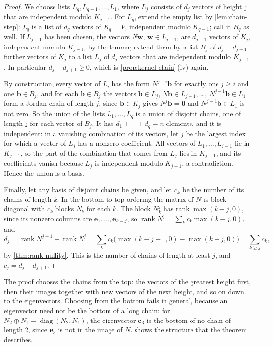 \begin{proof}
We choose lists $L_q,L_{q-1},\ldots,L_1$, where $L_j$ consists of $d_j$ vectors of height $j$ that are independent modulo $K_{j-1}$. For $L_q$, extend the empty list by \cref{lem:chain-step}: $L_q$ is a list of $d_q$ vectors of $K_q=V$, independent modulo $K_{q-1}$; call it $B_q$ as well. If $L_{j+1}$ has been chosen, the vectors $N\mathbf w$, $\mathbf w\in L_{j+1}$, are $d_{j+1}$ vectors of $K_j$, independent modulo $K_{j-1}$, by the lemma; extend them by a list $B_j$ of $d_j-d_{j+1}$ further vectors of $K_j$ to a list $L_j$ of $d_j$ vectors that are independent modulo $K_{j-1}$. In particular $d_j-d_{j+1}\ge0$, which is \cref{prop:kernel-chain}\,(iv) again.

By construction, every vector of $L_i$ has the form $N^{j-i}\mathbf b$ for exactly one $j\ge i$ and one $\mathbf b\in B_j$, and for each $\mathbf b\in B_j$ the vectors $\mathbf b\in L_j$, $N\mathbf b\in L_{j-1}$, \ldots, $N^{j-1}\mathbf b\in L_1$ form a Jordan chain of length $j$, since $\mathbf b\in K_j$ gives $N^j\mathbf b=\mathbf 0$ and $N^{j-1}\mathbf b\in L_1$ is not zero. So the union of the lists $L_1,\ldots,L_q$ is a union of disjoint chains, one of length $j$ for each vector of $B_j$. It has $d_1+\cdots+d_q=n$ elements, and it is independent: in a vanishing combination of its vectors, let $j$ be the largest index for which a vector of $L_j$ has a nonzero coefficient. All vectors of $L_1,\ldots,L_{j-1}$ lie in $K_{j-1}$, so the part of the combination that comes from $L_j$ lies in $K_{j-1}$, and its coefficients vanish because $L_j$ is independent modulo $K_{j-1}$, a contradiction. Hence the union is a basis.

Finally, let any basis of disjoint chains be given, and let $c_k$ be the number of its chains of length $k$. In the bottom-to-top ordering the matrix of $N$ is block diagonal with $c_k$ blocks $N_k$ for each $k$. The block $N_k^j$ has rank $\max(k-j,0)$, since its nonzero columns are $\mathbf e_1,\ldots,\mathbf e_{k-j}$, so $\operatorname{rank}N^j=\sum_kc_k\max(k-j,0)$, and
\[
d_j=\operatorname{rank}N^{j-1}-\operatorname{rank}N^j=\sum_kc_k\bigl(\max(k-j+1,0)-\max(k-j,0)\bigr)=\sum_{k\ge j}c_k ,
\]
by \cref{thm:rank-nullity}. This is the number of chains of length at least $j$, and $c_j=d_j-d_{j+1}$.
\end{proof}

The proof chooses the chains from the top: the vectors of the greatest height first, then their images together with new vectors of the next height, and so on down to the eigenvectors. Choosing from the bottom fails in general, because an eigenvector need not be the bottom of a long chain: for $N_2\oplus N_1=\operatorname{diag}(N_2,N_1)$, the eigenvector $\mathbf e_3$ is the bottom of no chain of length $2$, since $\mathbf e_3$ is not in the image of $N$.  shows the structure that the theorem describes.

